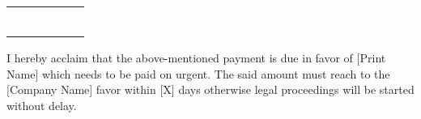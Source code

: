 \documentclass[14pt]{article}
\begin{document}
\begin{table}[H]
\begin{adjustbox}{max width=\textwidth}
\begin{tabular}{p{2.04cm}p{2.71cm}p{4.76cm}p{3.20cm}p{3.19cm}p{3.15cm}}
\hhline{------}
\multicolumn{1}{|p{2.04cm}|}{\par \centering {\normalsize{ }}} & 
\multicolumn{1}{|p{2.71cm}|}{\par \centering {\normalsize{ }}} & 
\multicolumn{1}{|p{4.76cm}|}{\par \centering {\normalsize{ }}} & 
\multicolumn{1}{|p{3.20cm}|}{\par \centering {\normalsize{ }}} & 
\multicolumn{1}{|p{3.19cm}|}{\par \centering {\normalsize{ }}} & 
\multicolumn{1}{|p{3.15cm}|}{\par \centering {\normalsize{ }}} \\ 
\hhline{------}
\multicolumn{3}{|p{9.51cm}|}{\multirow{4}{*}{\parbox{9.51cm}{\par \raggedright { }}}} & 
\multicolumn{1}{|p{3.20cm}|}{\centering {Total Discount}} & 
\multicolumn{1}{|p{3.19cm}|}{\centering { }} & 
\multicolumn{1}{|p{3.15cm}|}{\par \centering {\normalsize{ }}} \\ 
\hhline{-~~---}
\multicolumn{1}{|p{2.04cm}|}{ } & 
\multicolumn{1}{p{2.71cm}}{ } & 
\multicolumn{1}{p{4.76cm}}{ } & 
\multicolumn{1}{|p{3.20cm}|}{\multirow{3}{*}{\parbox{3.20cm}{\par \centering { }}}} & 
\multicolumn{1}{|p{3.19cm}|}{\centering {Subtotal
}} & 
\multicolumn{1}{|p{3.15cm}|}{\centering {\normalsize{ }}} \\ 
\hhline{-~~---}
\multicolumn{1}{|p{2.04cm}|}{ } & 
\multicolumn{1}{p{2.71cm}}{ } & 
\multicolumn{1}{p{4.76cm}}{ } & 
\multicolumn{1}{|p{3.20cm}|}{ } & 
\multicolumn{1}{|p{3.19cm}|}{\centering {Sales Tax
}} & 
\multicolumn{1}{|p{3.15cm}|}{\centering {\normalsize{ }}} \\ 
\hhline{-~~---}
\multicolumn{1}{|p{2.04cm}|}{ } & 
\multicolumn{1}{p{2.71cm}}{ } & 
\multicolumn{1}{p{4.76cm}}{ } & 
\multicolumn{1}{|p{3.20cm}|}{ } & 
\multicolumn{1}{|p{3.19cm}|}{\centering {Total Amount}} & 
\multicolumn{1}{|p{3.15cm}|}{\centering {\normalsize{ }}} \\ 
\hhline{-~~---}
\end{tabular}
\end{adjustbox}
\end{table}
\raggedright \par \raggedright {I hereby acclaim that the above-mentioned payment is due in favor of [Print Name] which needs to be paid on urgent. The said amount must reach to the [Company Name] favor within [X] days otherwise legal proceedings will be started without delay.\par }
\end{document}
